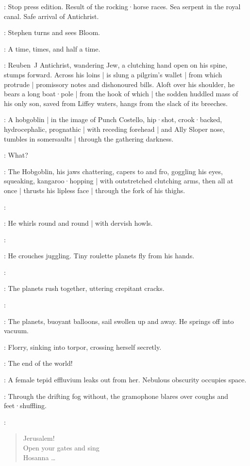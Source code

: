 \Newsboys:
Stop press edition.
Result of the rocking·horse races.
Sea serpent in the royal canal.
Safe arrival of Antichrist.

:
Stephen turns and sees Bloom.

\Stephen:
A time,
times,
and half a time.

:
Reuben~J Antichrist,
wandering Jew,
a clutching hand open on his spine,
stumps forward.
Across his loins |
is slung a pilgrim's wallet |
from which protrude |
promissory notes and dishonoured bills.
Aloft over his shoulder,
he bears a long boat·pole |
from the hook of which |
the sodden huddled mass of his only son,
saved from Liffey waters,
hangs from the slack of its breeches.

:
A hobgoblin |
in the image of Punch Costello,
hip·shot,
crook·backed,
hydrocephalic,
prognathic |
with receding forehead |
and Ally Sloper nose,
tumbles in somersaults |
through the gathering darkness.

\All:
What?

:
The Hobgoblin,
his jaws chattering,
capers to and fro,
goggling his eyes,
squeaking,
kangaroo·hopping |
with outstretched clutching arms,
then all at once |
thrusts his lipless face |
through the fork of his thighs.

\Hobgoblin:

:
He whirls round and round |
with dervish howls.

\Hobgoblin:

:
He crouches juggling.
Tiny roulette planets fly from his hands.

\Hobgoblin:

:
The planets rush together,
uttering crepitant cracks.

\Hobgoblin:

:
The planets,
buoyant balloons,
sail swollen up and away.
He springs off into vacuum.

:
Florry,
sinking into torpor,
crossing herself secretly.

\Florry:
The end of the world!

:
A female tepid effluvium leaks out from her.
Nebulous obscurity occupies space.

:
Through the drifting fog without,
the gramophone blares over coughs and feet·shuffling.

\Gramophone:
\begin{verse}
    Jerusalem!\\
    Open your gates and sing\\
    Hosanna \ldots
\end{verse}


